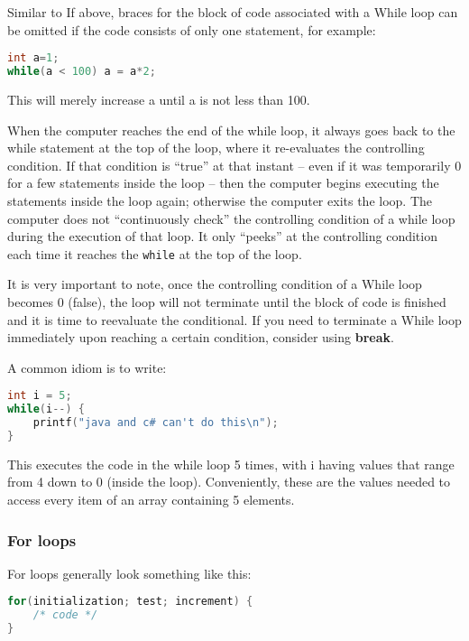 Similar to If above, braces for the block of code associated with a While loop
can be omitted if the code consists of only one statement, for example:
\lstset{basicstyle=\scriptsize, numbers=left, captionpos=b, tabsize=4}
\begin{lstlisting}[caption=Section \thesection listing \arabic{controlcnt},language={C},
breaklines=true,xleftmargin=15pt, label=lst:section\thesection listing\arabic{controlcnt}]
int a=1;
while(a < 100) a = a*2;
\end{lstlisting}

This will merely increase a until a is not less than 100.

When the computer reaches the end of the while loop, it always goes back to the
while statement at the top of the loop, where it re-evaluates the controlling
condition.  If that condition is ``true'' at that instant -- even if it was
temporarily 0 for a few statements inside the loop -- then the computer begins
executing the statements inside the loop again; otherwise the computer exits
the loop.  The computer does not ``continuously check'' the controlling
condition of a while loop during the execution of that loop.  It only ``peeks''
at the controlling condition each time it reaches the \texttt{while} at the top
of the loop.

It is very important to note, once the controlling condition of a While loop
becomes 0 (false), the loop will not terminate until the block of code is
finished and it is time to reevaluate the conditional. If you need to terminate
a While loop immediately upon reaching a certain condition, consider using
\textbf{break}.

A common idiom is to write:
\lstset{basicstyle=\scriptsize, numbers=left, captionpos=b, tabsize=4}
\begin{lstlisting}[caption=Section \thesection listing \arabic{controlcnt},language={C},
breaklines=true,xleftmargin=15pt, label=lst:section\thesection listing\arabic{controlcnt}]
int i = 5;
while(i--) {
	printf("java and c# can't do this\n");
}
\end{lstlisting}

This executes the code in the while loop 5 times, with i having values that
range from 4 down to 0 (inside the loop). Conveniently, these are the values
needed to access every item of an array containing 5 elements.

\subsubsection{For loops}
For loops generally look something like this:
\lstset{basicstyle=\scriptsize, numbers=left, captionpos=b, tabsize=4}
\begin{lstlisting}[caption=Section \thesection listing \arabic{controlcnt},language={C},
breaklines=true,xleftmargin=15pt, label=lst:section\thesection listing\arabic{controlcnt}]
for(initialization; test; increment) {
	/* code */
}
\end{lstlisting}

